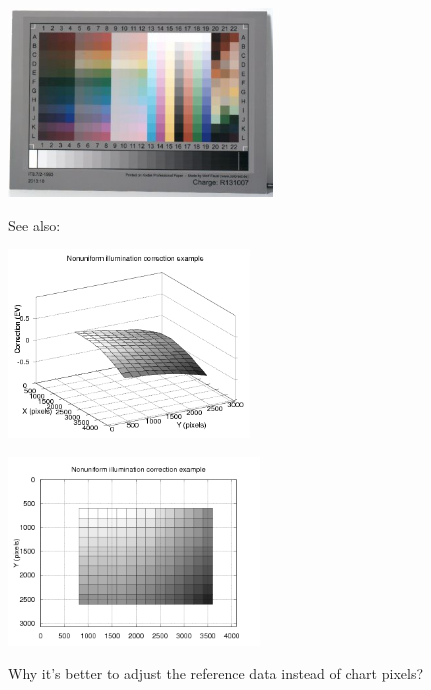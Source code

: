 \begin{center}
\includegraphics[height=5cm]{images/it8_lum_correction}
\end{center}

See also:\\

\begin{center}
\includegraphics[height=5cm]{images/it8_lum_correction_3d}
\end{center}

\begin{center}
\includegraphics[height=5cm]{images/it8_lum_correction_2d}
\end{center}

Why it's better to adjust the reference data instead of chart pixels?\\


